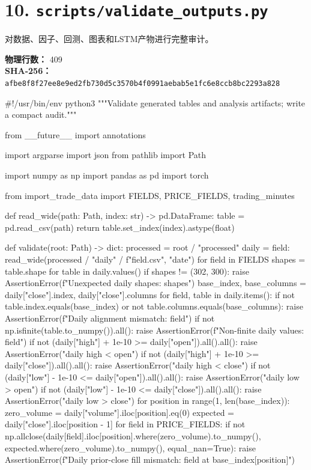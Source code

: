\documentclass[UTF8,a4paper,fontset=fandol]{ctexart}
\begin{document}
\section{10. \texttt{scripts/validate\_outputs.py}}
对数据、因子、回测、图表和LSTM产物进行完整审计。

\textbf{物理行数：} 409\\
\textbf{SHA-256：} \texttt{afbe8f8f27ee8e9ed2fb730d5c3570b4f0991aebab5e1fc6e8ccb8bc2293a828}

\begin{ProjectCode}
#!/usr/bin/env python3
"""Validate generated tables and analysis artifacts; write a compact audit."""

from __future__ import annotations

import argparse
import json
from pathlib import Path

import numpy as np
import pandas as pd
import torch

from import_trade_data import FIELDS, PRICE_FIELDS, trading_minutes


def read_wide(path: Path, index: str) -> pd.DataFrame:
    table = pd.read_csv(path)
    return table.set_index(index).astype(float)


def validate(root: Path) -> dict:
    processed = root / "processed"
    daily = {field: read_wide(processed / "daily" / f"{field}.csv", "date")
             for field in FIELDS}
    shapes = {table.shape for table in daily.values()}
    if shapes != {(302, 300)}:
        raise AssertionError(f"Unexpected daily shapes: {shapes}")
    base_index, base_columns = daily["close"].index, daily["close"].columns
    for field, table in daily.items():
        if not table.index.equals(base_index) or not table.columns.equals(base_columns):
            raise AssertionError(f"Daily alignment mismatch: {field}")
        if not np.isfinite(table.to_numpy()).all():
            raise AssertionError(f"Non-finite daily values: {field}")
    if not (daily["high"] + 1e-10 >= daily["open"]).all().all():
        raise AssertionError("daily high < open")
    if not (daily["high"] + 1e-10 >= daily["close"]).all().all():
        raise AssertionError("daily high < close")
    if not (daily["low"] - 1e-10 <= daily["open"]).all().all():
        raise AssertionError("daily low > open")
    if not (daily["low"] - 1e-10 <= daily["close"]).all().all():
        raise AssertionError("daily low > close")
    for position in range(1, len(base_index)):
        zero_volume = daily["volume"].iloc[position].eq(0)
        expected = daily["close"].iloc[position - 1]
        for field in PRICE_FIELDS:
            if not np.allclose(daily[field].iloc[position].where(zero_volume).to_numpy(),
                               expected.where(zero_volume).to_numpy(), equal_nan=True):
                raise AssertionError(f"Daily prior-close fill mismatch: {field} at {base_index[position]}")


\end{ProjectCode}
\end{document}
